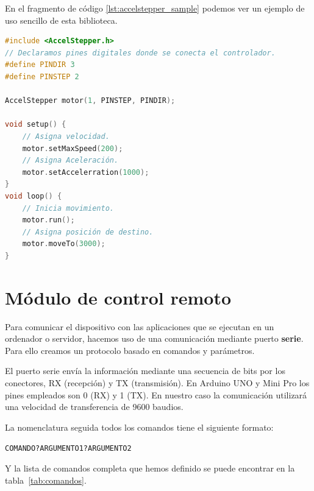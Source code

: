En el fragmento de código \ref{lst:accelstepper_sample} podemos ver un ejemplo de uso sencillo de esta biblioteca.

\begin{lstlisting}[language=cpp, caption={Ejemplo de uso de AccelStepper, biblioteca usada para controlar motores paso a paso},label={lst:accelstepper_sample}]
#include <AccelStepper.h>
// Declaramos pines digitales donde se conecta el controlador.
#define PINDIR 3
#define PINSTEP 2

AccelStepper motor(1, PINSTEP, PINDIR);

void setup() {
	// Asigna velocidad.
	motor.setMaxSpeed(200);
	// Asigna Aceleración.
	motor.setAccelerration(1000);
}
void loop() {
	// Inicia movimiento.
	motor.run();
	// Asigna posición de destino.
	motor.moveTo(3000);
}

\end{lstlisting}


\section{Módulo de control remoto}

Para comunicar el dispositivo con las aplicaciones que se ejecutan en un ordenador o servidor, hacemos uso de una comunicación mediante puerto \textbf{serie}. Para ello creamos un protocolo basado en comandos y parámetros. 

El puerto serie envía la información mediante una secuencia de bits por los conectores, RX (recepción) y TX (transmisión). En Arduino UNO y Mini Pro los pines empleados son 0 (RX) y 1 (TX). En nuestro caso la comunicación utilizará una velocidad de transferencia de 9600 baudios.

La nomenclatura seguida todos los comandos tiene el siguiente formato: 


\begin{center}
	\texttt{COMANDO?ARGUMENTO1?ARGUMENTO2 } 
\end{center}

Y la lista de comandos completa que hemos definido se puede encontrar en la tabla~\ref{tab:comandos}.

